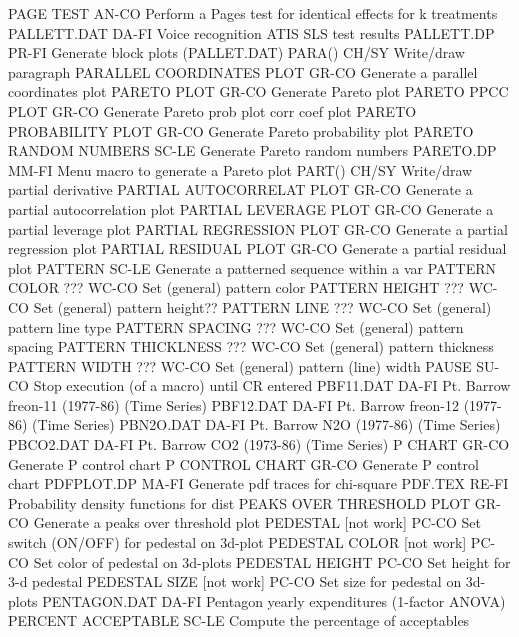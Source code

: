 PAGE TEST                   AN-CO Perform a Pages test for identical effects for k treatments
PALLETT.DAT                 DA-FI Voice recognition ATIS SLS test results
PALLETT.DP                  PR-FI Generate block plots (PALLET.DAT)
PARA()                      CH/SY Write/draw paragraph
PARALLEL COORDINATES PLOT   GR-CO Generate a parallel coordinates plot
PARETO PLOT                 GR-CO Generate Pareto plot
PARETO PPCC PLOT            GR-CO Generate Pareto prob plot corr coef plot
PARETO PROBABILITY PLOT     GR-CO Generate Pareto probability plot
PARETO RANDOM NUMBERS       SC-LE Generate Pareto random numbers
PARETO.DP                   MM-FI Menu macro to generate a Pareto plot
PART()                      CH/SY Write/draw partial derivative
PARTIAL AUTOCORRELAT PLOT   GR-CO Generate a partial autocorrelation plot
PARTIAL LEVERAGE PLOT       GR-CO Generate a partial leverage plot
PARTIAL REGRESSION PLOT     GR-CO Generate a partial regression plot
PARTIAL RESIDUAL PLOT       GR-CO Generate a partial residual plot
PATTERN                     SC-LE Generate a patterned sequence within a var
PATTERN COLOR        ???    WC-CO Set (general) pattern color
PATTERN HEIGHT       ???    WC-CO Set (general) pattern height??
PATTERN LINE         ???    WC-CO Set (general) pattern line type
PATTERN SPACING      ???    WC-CO Set (general) pattern spacing
PATTERN THICKLNESS   ???    WC-CO Set (general) pattern thickness
PATTERN WIDTH        ???    WC-CO Set (general) pattern (line) width
PAUSE                       SU-CO Stop execution (of a macro) until CR entered
PBF11.DAT                   DA-FI Pt. Barrow freon-11 (1977-86) (Time Series)
PBF12.DAT                   DA-FI Pt. Barrow freon-12 (1977-86) (Time Series)
PBN2O.DAT                   DA-FI Pt. Barrow N2O (1977-86) (Time Series)
PBCO2.DAT                   DA-FI Pt. Barrow CO2 (1973-86) (Time Series)
P CHART                     GR-CO Generate P control chart
P CONTROL CHART             GR-CO Generate P control chart
PDFPLOT.DP                  MA-FI Generate pdf traces for chi-square 
PDF.TEX                     RE-FI Probability density functions for dist
PEAKS OVER THRESHOLD PLOT   GR-CO Generate a peaks over threshold plot
PEDESTAL        [not work]  PC-CO Set switch (ON/OFF) for pedestal on 3d-plot
PEDESTAL COLOR  [not work]  PC-CO Set color of pedestal on 3d-plots
PEDESTAL HEIGHT             PC-CO Set height for 3-d pedestal
PEDESTAL SIZE   [not work]  PC-CO Set size for pedestal on 3d-plots
PENTAGON.DAT                DA-FI Pentagon yearly expenditures (1-factor ANOVA)
PERCENT ACCEPTABLE          SC-LE Compute the percentage of acceptables 
